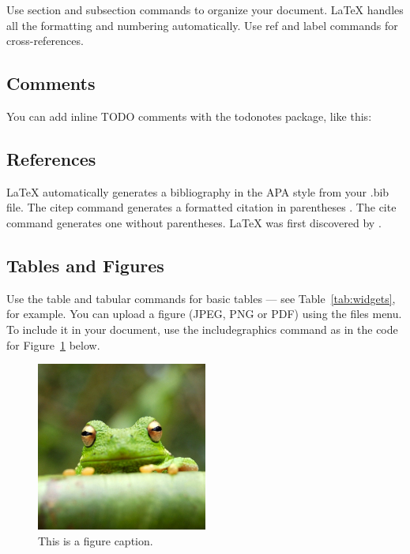 \documentclass[a4paper,man,natbib]{apa6}
\begin{document}
\begin{enumerate}
Use section and subsection commands to organize your document. \LaTeX{} handles all the formatting and numbering automatically. Use ref and label commands for cross-references.

\subsection{Comments}

You can add inline TODO comments with the todonotes package, like this:

\subsection{References}

LaTeX automatically generates a bibliography in the APA style from your .bib file. The citep command generates a formatted citation in parentheses \citep{Lamport1986}. The cite command generates one without parentheses. LaTeX was first discovered by \cite{Lamport1986}.

\subsection{Tables and Figures}

Use the table and tabular commands for basic tables --- see Table~\ref{tab:widgets}, for example. You can upload a figure (JPEG, PNG or PDF) using the files menu. To include it in your document, use the includegraphics command as in the code for Figure~\ref{fig:frog} below.

\begin{figure}
\centering
\includegraphics[width=0.5\textwidth]{frog.jpg}
\caption{\label{fig:frog}This is a figure caption.}
\end{figure}


\end{enumerate}
\end{document}
